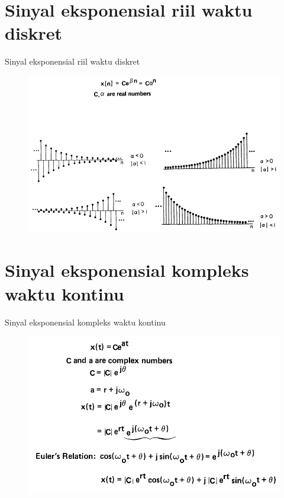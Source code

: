 \documentclass[pdflatex,compress,mathserif]{beamer}
\begin{document}
\section{Sinyal eksponensial riil waktu diskret}
\begin{frame}{Sinyal eksponensial riil waktu diskret}
	\begin{figure}
		\centering
		\includegraphics[height=0.8\textheight]{img/01.slide_15}
	\end{figure}
\end{frame}

\section{Sinyal eksponensial kompleks waktu kontinu}
\begin{frame}{Sinyal eksponensial kompleks waktu kontinu}
	\begin{figure}
		\centering
		\includegraphics[height=0.8\textheight]{img/01.slide_16}
	\end{figure}
\end{frame}
\end{document}
